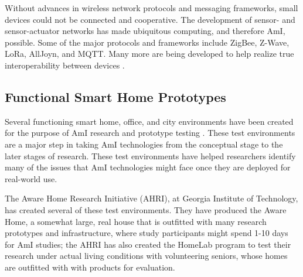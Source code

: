 \documentclass{article}
\begin{document}
Without advances in wireless network protocols and messaging frameworks, small devices could not be connected and cooperative. The development of sensor- and sensor-actuator networks has made ubiquitous computing, and therefore AmI, possible. Some of the major protocols and frameworks include ZigBee, Z-Wave, LoRa, AllJoyn, and MQTT. Many more are being developed to help realize true interoperability between devices \cite{elevenprotocols}.


%
\subsection{Functional Smart Home Prototypes}
Several functioning smart home, office, and city environments have been created for the purpose of AmI research and prototype testing \cite{Cook:2007:SOE:1225943.1226005}. These test environments are a major step in taking AmI technologies from the conceptual stage to the later stages of research. These test environments have helped researchers identify many of the issues that AmI technologies might face once they are deployed for real-world use. 

The Aware Home Research Initiative (AHRI), at Georgia Institute of Technology, has created several of these test environments. They have produced the Aware Home, a somewhat large, real house that is outfitted with many research prototypes and infrastructure, where study participants might spend 1-10 days for AmI studies; the AHRI has also created the HomeLab program to test their research under actual living conditions with volunteering seniors, whose homes are outfitted with with products for evaluation. \cite{ahri}
\end{document}
